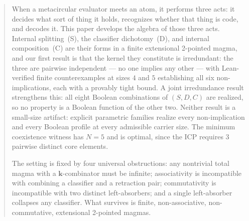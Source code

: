 \documentclass[sigconf,screen]{acmart}
\theoremstyle{remark}
\begin{document}
\begin{abstract}
When a metacircular evaluator meets an atom, it performs three acts: it decides what sort of thing it holds, recognizes whether that thing is code, and decodes it. This paper develops the algebra of those three acts. Internal splitting~(S), the classifier dichotomy~(D), and internal composition~(C) are their forms in a finite extensional 2-pointed magma, and our first result is that the kernel they constitute is irredundant: the three are pairwise independent --- no one implies any other --- with Lean-verified finite counterexamples at sizes $4$ and $5$ establishing all six non-implications, each with a provably tight bound. A joint irredundance result strengthens this: all eight Boolean combinations of $(S, D, C)$ are realized, so no property is a Boolean function of the other two. Neither result is a small-size artifact: explicit parametric families realize every non-implication and every Boolean profile at every admissible carrier size. The minimum coexistence witness has $N\!=\!5$ and is optimal, since the ICP requires $3$ pairwise distinct core elements.

The setting is fixed by four universal obstructions: any nontrivial total magma with a $\mathbf{k}$-combinator must be infinite; associativity is incompatible with combining a classifier and a retraction pair; commutativity is incompatible with two distinct left-absorbers; and a single left-absorber collapses any classifier. What survives is finite, non-associative, non-commutative, extensional 2-pointed magmas.


\end{abstract}
\end{document}
